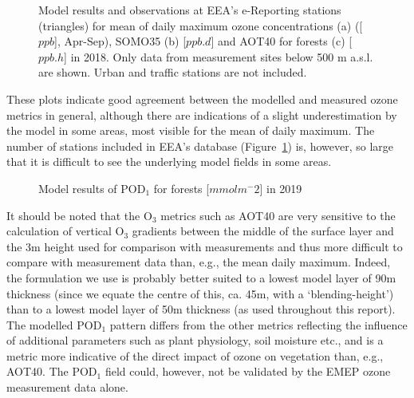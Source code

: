 \begin{figure}[H]
  \centering
\caption{Model results and observations at EEA's e-Reporting stations (triangles) for mean of daily maximum ozone concentrations (a) ([$ppb$], Apr-Sep), SOMO35 (b) [$ppb.d$] and AOT40 for forests (c) [$ppb.h$] in 2018. Only data from measurement sites below 500 m a.s.l. are shown. Urban and traffic stations are not included.}
\label{fig:indicators_airbase}
\end{figure}

These plots indicate good agreement between the modelled and measured ozone metrics in general, although there are indications of a slight underestimation by the model in some areas, most visible for the mean of daily maximum. The number of stations included in EEA's database (Figure~\ref{fig:indicators_airbase}) is, however, so large that it is difficult to see the underlying model fields in some areas.

\begin{figure}[H]
\caption{Model results of POD$_1$ for forests [$mmol m^-2$] in 2019}
\label{fig:indicatorPOD}
\end{figure}

It should be noted that the O$_3$ metrics such as AOT40 are very sensitive to the calculation of vertical O$_3$ gradients between the middle of the surface layer and the 3m height used for comparison with measurements \citep{Tuovinen:EP2007} and thus more difficult to compare with measurement data than, e.g., the mean daily maximum. Indeed, the formulation we use \citep{Simpson:EMEP2012} is probably better suited to a lowest model layer of 90m thickness (since we equate the centre of this, ca. 45m, with a `blending-height') than to a lowest model layer of 50m thickness (as used throughout this report). 
The modelled POD$_1$ pattern differs from the other metrics reflecting the influence of additional parameters such as plant physiology, soil moisture etc., and is a metric more indicative of the direct impact of ozone on vegetation than, e.g., AOT40. The POD$_1$ field could, however, not be validated by the EMEP ozone measurement data alone. 


